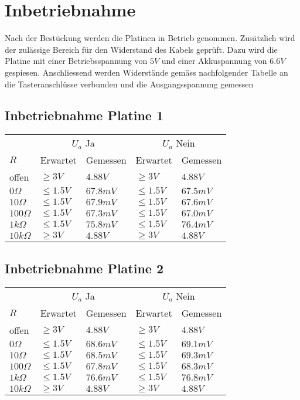 
\section{Inbetriebnahme}
Nach der Bestückung werden die Platinen in Betrieb genommen. Zusätzlich wird 
der zulässige Bereich für den Widerstand des Kabels geprüft. Dazu wird die 
Platine mit einer Betriebsspannung von $5 V$ und einer Akkuspannung von $6.6 V$ 
gespiesen. Anschliessend werden Widerstände gemäss nachfolgender Tabelle an die 
Tasteranschlüsse verbunden und die Ausgangsspannung gemessen

\subsection{Inbetriebnahme Platine 1}
\begin{tabular}{@{}lllll}
                & \multicolumn{2}{c}{$U_a$ Ja}  & \multicolumn{2}{c}{$U_a$ Nein} \\
  $R$           & Erwartet  & Gemessen  & Erwartet  & Gemessen  \\
  offen         & $\geq3V$  & $4.88V$   & $\geq3V$  & $4.88V$   \\
  $0 \Omega$    & $\leq1.5V$& $67.8mV$  & $\leq1.5V$& $67.5mV$  \\
  $10 \Omega$   & $\leq1.5V$& $67.9mV$  & $\leq1.5V$& $67.6mV$  \\
  $100 \Omega$  & $\leq1.5V$& $67.3mV$  & $\leq1.5V$& $67.0mV$  \\
  $1 k\Omega$   & $\leq1.5V$& $75.8mV$  & $\leq1.5V$& $76.4mV$  \\
  $10 k\Omega$  & $\geq3V$  & $4.88V$   & $\geq3V$  & $4.88V$   \\
\end{tabular}

\subsection{Inbetriebnahme Platine 2}
\begin{tabular}{@{}lllll}
                & \multicolumn{2}{c}{$U_a$ Ja}  & \multicolumn{2}{c}{$U_a$ Nein} \\
  $R$           & Erwartet  & Gemessen  & Erwartet  & Gemessen  \\
  offen         & $\geq3V$  & $4.88V$   & $\geq3V$  & $4.88V$   \\
  $0 \Omega$    & $\leq1.5V$& $68.6mV$  & $\leq1.5V$& $69.1mV$  \\
  $10 \Omega$   & $\leq1.5V$& $68.5mV$  & $\leq1.5V$& $69.3mV$  \\
  $100 \Omega$  & $\leq1.5V$& $67.8mV$  & $\leq1.5V$& $68.3mV$  \\
  $1 k\Omega$   & $\leq1.5V$& $76.6mV$  & $\leq1.5V$& $76.8mV$  \\
  $10 k\Omega$  & $\geq3V$  & $4.88V$   & $\geq3V$  & $4.88V$   \\
\end{tabular}